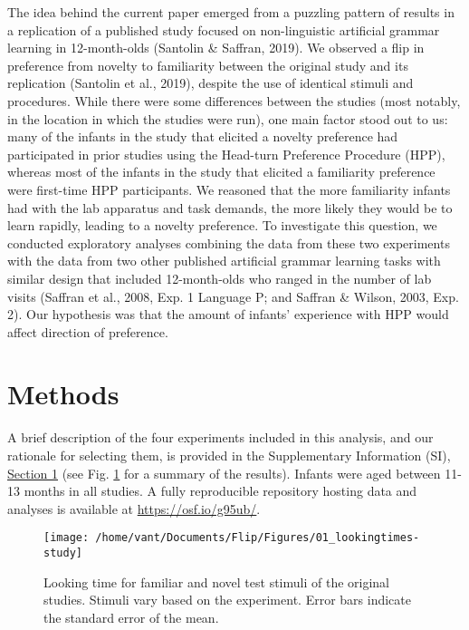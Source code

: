 \documentclass[
  english,
  man,man,floatsintext]{apa6}
\begin{document}
The idea behind the current paper emerged from a puzzling pattern of results in a replication of a published study focused on non-linguistic artificial grammar learning in 12-month-olds (Santolin \& Saffran, 2019). We observed a flip in preference from novelty to familiarity between the original study and its replication (Santolin et al., 2019), despite the use of identical stimuli and procedures. While there were some differences between the studies (most notably, in the location in which the studies were run), one main factor stood out to us: many of the infants in the study that elicited a novelty preference had participated in prior studies using the Head-turn Preference Procedure (HPP), whereas most of the infants in the study that elicited a familiarity preference were first-time HPP participants. We reasoned that the more familiarity infants had with the lab apparatus and task demands, the more likely they would be to learn rapidly, leading to a novelty preference. To investigate this question, we conducted exploratory analyses combining the data from these two experiments with the data from two other published artificial grammar learning tasks with similar design that included 12-month-olds who ranged in the number of lab visits (Saffran et al., 2008, Exp. 1 Language P; and Saffran \& Wilson, 2003, Exp. 2). Our hypothesis was that the amount of infants' experience with HPP would affect direction of preference.

\hypertarget{methods}{%
\section{Methods}\label{methods}}

A brief description of the four experiments included in this analysis, and our rationale for selecting them, is provided in the Supplementary Information (SI), \protect\hyperlink{s1}{Section 1} (see Fig. \ref{fig:fig1} for a summary of the results). Infants were aged between 11-13 months in all studies. A fully reproducible repository hosting data and analyses is available at \url{https://osf.io/g95ub/}.

\begin{figure}
\texttt{[image: /home/vant/Documents/Flip/Figures/01\_lookingtimes-study]} \caption{Looking time for familiar and novel test stimuli of the original studies. Stimuli vary based on the experiment. Error bars indicate the standard error of the mean.}\label{fig:fig1}
\end{figure}
\end{document}
